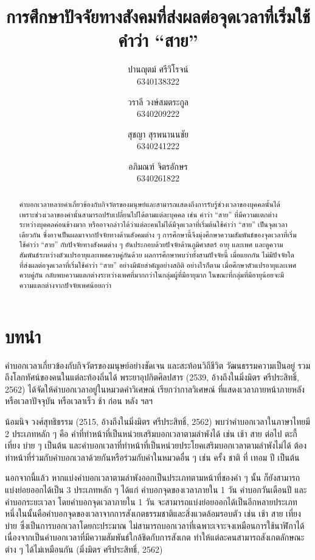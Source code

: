 \documentclass[a4paper]{article}
\title{การศึกษาปัจจัยทางสังคมที่ส่งผลต่อจุดเวลาที่เริ่มใช้คำว่า “สาย”}
\author{
    ปานญุตม์ ศรีวิโรจน์\\6340138322
    \and
    วราลี วงษ์สมตระกูล\\6340209222
    \and
    สุชญา สุรพนานนชัย\\6340241222
    \and
    อภิมณฑ์ จิตรอักษร\\6340261822
}
\date{}
\begin{document}
\maketitle
\begin{abstract}
    คำบอกเวลาหลายคำเกี่ยวข้องกับกิจวัตรของมนุษย์และสามารถแสดงถึงการรับรู้ช่วงเวลาของบุคคลนั้นได้ เพราะช่วงเวลาของคำนั้นสามารถปรับเปลี่ยนไปได้ตามแต่ละบุคคล เช่น คำว่า “สาย” ที่มีความแตกต่างระหว่างบุคคลค่อนข้างมาก หรืออาจกล่าวได้ว่าแต่ละคนไม่ได้มีจุดเวลาที่เริ่มต้นใช้คำว่า “สาย” เป็นจุดเวลาเดียวกัน ซึ่งอาจเป็นผลมาจากปัจจัยทางด้านสังคมต่าง ๆ การศึกษานี้จึงมุ่งศึกษาความสัมพันธ์ของจุดเวลาที่เริ่มใช้คำว่า “สาย” กับปัจจัยทางสังคมต่าง ๆ อันประกอบด้วยปัจจัยด้านภูมิศาสตร์ อายุ และเพศ และดูความสัมพันธ์ระหว่างตัวแปรอายุและเพศควบคู่กันด้วย ผลการศึกษาพบว่าทั้งสามปัจจัยนี้ เมื่อแยกกัน ไม่มีปัจจัยใดที่ส่งผลต่อจุดเวลาที่เริ่มใช้คำว่า “สาย” อย่างมีนัยสำคัญอย่างสถิติ อย่างไรก็ตาม เมื่อศึกษาตัวแปรอายุและเพศควบคู่กัน กลับพบความแตกต่างระหว่างเพศที่มากกว่าในกลุ่มผู้ที่มีอายุมาก ในขณะที่กลุ่มที่มีอายุน้อยจะมีความแตกต่างจากปัจจัยเพศน้อยกว่า
\end{abstract}
\section{บทนำ}
    คำบอกเวลาเกี่ยวข้องกับกิจวัตรของมนุษย์อย่างชัดเจน และสะท้อนวิถีชีวิต วัฒนธรรมความเป็นอยู่ รวมถึงโลกทัศน์ของคนในแต่ละท้องถิ่นได้ พระยาอุปกิตศิลปสาร (2539, อ้างถึงในมิ่งมิตร ศรีประสิทธิ์, 2562) ได้จัดให้คำบอกเวลาอยู่ในหมวดคำวิเศษณ์ เรียกว่ากาลวิเศษณ์ ที่แสดงเวลาภายหน้าภายหลัง หรือเวลาปัจจุบัน หรือเวลาเร็ว ช้า ก่อน หลัง ฯลฯ

    น้อมนิจ วงศ์สุทธิธรรม (2515, อ้างถึงในมิ่งมิตร ศรีประสิทธิ์, 2562) พบว่าคำบอกเวลาในภาษาไทยมี 2 ประเภทหลัก ๆ คือ คำที่ทำหน้าที่เป็นหน่วยเสริมบอกเวลาตามลำพังได้ เช่น เช้า สาย ต่อไป ตะกี้ เที่ยง บ่าย ๆ เป็นต้น และคำบอกเวลาที่ทำหน้าที่เป็นหน่วยประโยคเสริมบอกเวลาตามลำพังไม่ได้ ต้องทำหน้าที่ร่วมกับคำบอกเวลาด้วยกันหรือร่วมกับคำในหมวด\break อื่น ๆ เช่น ครั้ง ชาติ ที่ เทอม ปี เป็นต้น

    นอกจากนี้แล้ว หากแบ่งคำบอกเวลาตามลำพังออกเป็นประเภทตามหน้าที่ของคำ ๆ นั้น ก็ยังสามารถแบ่งย่อยออกได้เป็น 3 ประเภทหลัก ๆ ได้แก่ คำบอกจุดของเวลาภายใน 1 วัน คำบอกวันเดือนปี และคำบอกระยะเวลา โดยคำบอกจุดเวลาภายใน 1 วัน จะสามารถแบ่งย่อยออกได้เป็นอีกหลายประเภท  หนึ่งในนั้นคือคำบอกจุดของเวลาจากการสังเกตธรรมชาติและสิ่งแวดล้อมรอบตัว เช่น เช้า สาย เที่ยง บ่าย ซึ่งเป็นการบอกเวลาโดยกะประมาณ ไม่สามารถบอกเวลาที่เฉพาะเจาะจงเหมือนการใช้นาฬิกาได้ เนื่องจากเป็นคำบอกเวลาที่มีความสัมพันธ์ใกล้ชิดกับการสังเกต ทำให้แต่ละคนสามารถสังเกตลักษณะ\break ต่าง ๆ ได้ไม่เหมือนกัน (มิ่งมิตร ศรีประสิทธิ์, 2562)
\end{document}
